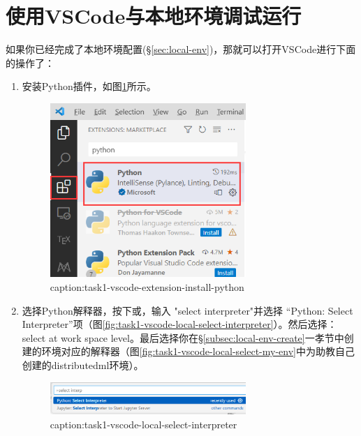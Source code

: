 \section{使用VSCode与本地环境调试运行}

如果你已经完成了本地环境配置(\S\ref{sec:local-env})，那就可以打开VSCode进行下面的操作了：

\begin{enumerate}
    \item 安装Python插件，如图\ref{fig:task1-vscode-extension-install-python}所示。
        \begin{figure}[htbp]
            \centering
            \includegraphics[width=0.7\textwidth]{figures/task1-vscode-extension-install-python.png}
            \caption{caption:task1-vscode-extension-install-python}
            \label{fig:task1-vscode-extension-install-python}
        \end{figure}
    \item 选择Python解释器，按下或，输入 "select interpreter"并选择 “Python: Select Interpreter”项（图\ref{fig:task1-vscode-local-select-interpreter}）。然后选择：select at work space level。最后选择你在\S\ref{subsec:local-env-create}一孝节中创建的环境对应的解释器（图\ref{fig:task1-vscode-local-select-my-env}中为助教自己创建的distributedml环境）。
        \begin{figure}[htbp]
            \centering
            \includegraphics[width=0.7\textwidth]{figures/task1-vscode-local-select-interpreter.png}
            \caption{caption:task1-vscode-local-select-interpreter}

\end{figure}
\end{enumerate}
